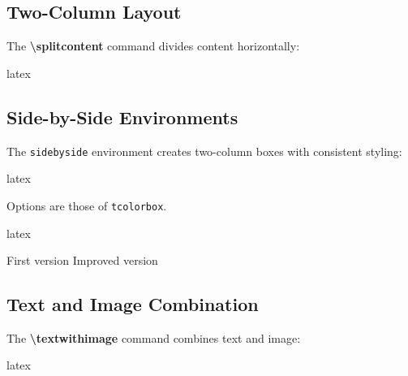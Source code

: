 \documentclass[
    margin=2cm
]{neoschool}
\begin{document}
\subsection{Two-Column Layout}

The \textbf{\textbackslash splitcontent} command divides content horizontally:

\begin{code}{latex}

\end{code}

\subsection{Side-by-Side
Environments}

The \texttt{sidebyside} environment creates two-column
boxes with consistent styling:

\begin{code}{latex}
\begin{sidebyside}[options]
    \tcblower
\end{sidebyside}
\end{code}

Options are those of \texttt{tcolorbox}.

\begin{code}{latex}
\begin{sidebyside}[
    title=Comparison,
    colback=exampleColor!5,
    colbacklower=exampleColor!10
]
    First version
    \tcblower
    Improved version
\end{sidebyside}
\end{code}

\subsection{Text and Image
Combination}

The \textbf{\textbackslash textwithimage} command combines text and image:

\begin{code}{latex}


\end{code}
\end{document}
